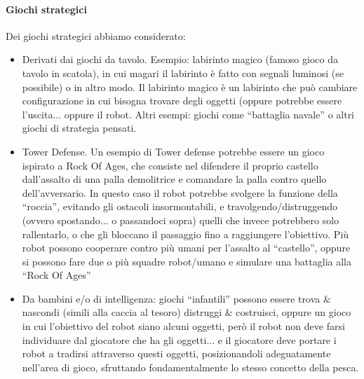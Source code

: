 \paragraph{Giochi strategici} Dei giochi strategici abbiamo considerato:
\begin{itemize}
\item Derivati dai giochi da tavolo. Esempio: labirinto magico (famoso gioco da tavolo in scatola), in cui magari il labirinto è fatto con segnali luminosi (se possibile) o in altro modo. Il labirinto magico è un labirinto che può cambiare configurazione in cui bisogna trovare degli oggetti (oppure potrebbe essere l’uscita... oppure il robot. Altri esempi: giochi come “battaglia navale” o altri giochi di strategia pensati.
\item Tower Defense. Un esempio di Tower defense potrebbe essere un gioco ispirato a Rock Of Ages, che consiste nel difendere il proprio castello dall’assalto di una palla demolitrice e comandare la palla contro quello dell’avversario. In questo caso il robot potrebbe svolgere la funzione della “roccia”, evitando gli ostacoli insormontabili, e travolgendo/distruggendo (ovvero spostando... o passandoci sopra) quelli che invece potrebbero solo rallentarlo, o che gli bloccano il passaggio fino a raggiungere l’obiettivo. Più robot possono cooperare contro più umani per l’assalto al “castello”, oppure si possono fare due o più squadre robot/umano e simulare una battaglia alla “Rock Of Ages”
\item Da bambini e/o di intelligenza: giochi “infantili” possono essere trova \& nascondi (simili alla caccia al tesoro) distruggi \& costruisci, oppure un gioco in cui l’obiettivo del robot siano alcuni oggetti, però il robot non deve farsi individuare dal giocatore che ha gli oggetti... e il giocatore deve portare i robot a tradirsi attraverso questi oggetti, posizionandoli adeguatamente nell’area di gioco, sfruttando fondamentalmente lo stesso concetto della pesca.
\end{itemize}

